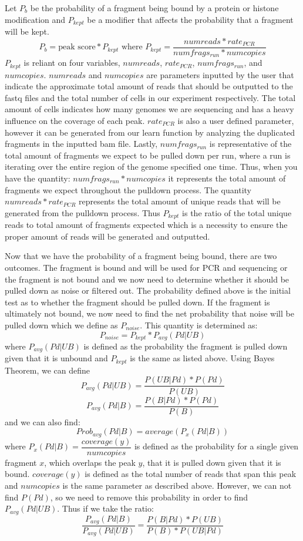  Let $P_b$ be the probability of a fragment being bound by a protein or histone modification and $P_{kept}$ be a modifier that affects the probability that a fragment will be kept. 
$$P_b = \text{peak score} * P_{kept} \text{ where } P_{kept} = \dfrac{numreads * rate_{PCR}}{numfrags_{run} * numcopies}$$
 $P_{kept}$ is reliant on four variables, $numreads$, $rate_{PCR}$, $numfrags_{run}$, and $numcopies$. $numreads$ and $numcopies$ are parameters inputted by the user that indicate the approximate total amount of reads that should be outputted to the fastq files and the total number of cells in our experiment respectively.
 The total amount of cells indicates how many genomes we are sequencing and has a heavy influence on the coverage of each peak.
 $rate_{PCR}$ is also a user defined parameter, however it can be generated from our learn function by analyzing the duplicated fragments in the inputted bam file. Lastly, $numfrags_{run}$ is representative of the total amount of fragments we expect to be pulled down per run, where a run is iterating over the entire region of the genome specified one time. Thus, when you have the quantity: $numfrags_{run}*numcopies$ it represents the total amount of fragments we expect throughout the pulldown process. The quantity $numreads*rate_{PCR}$ represents the total amount of unique reads that will be generated from the pulldown process. Thus $P_{kept}$ is the ratio of the total unique reads to total amount of fragments expected which is a necessity to ensure the proper amount of reads will be generated and outputted. 

Now that we have the probability of a fragment being bound, there are two outcomes. The fragment is bound and will be used for PCR and sequencing or the fragment is not bound and we now need to determine whether it should be pulled down as noise or filtered out. The probability defined above is the initial test as to whether the fragment should be pulled down. If the fragment is ultimately not bound, we now need to find the net probability that noise will be pulled down which we define as $P_{noise}$. This quantity is determined as:
$$P_{noise} = P_{kept}*P_{avg}(Pd|UB)$$
where $P_{avg}(Pd|UB)$ is defined as the probability the fragment is pulled down given that it is unbound and $P_{kept}$ is the same as listed above. Using Bayes Theorem, we can define
$$P_{avg}(Pd|UB) = \dfrac{P(UB|Pd)*P(Pd)}{P(UB)}$$
$$P_{avg}(Pd|B) = \dfrac{P(B|Pd)*P(Pd)}{P(B)}$$
and we can also find:
$$Prob_{avg}(Pd|B) = average(P_x(Pd|B))$$
where $P_x(Pd|B) = \dfrac{coverage(y)}{numcopies}$ is defined as the probability for a single given fragment $x$, which overlaps the peak $y$, that it is pulled down given that it is bound. $coverage(y)$ is defined as the total number of reads that span this peak and $numcopies$ is the same parameter as described above. However, we can not find $P(Pd)$, so we need to remove this probability in order to find $P_{avg}(Pd|UB)$.
Thus if we take the ratio:
$$\dfrac{P_{avg}(Pd|B)}{P_{avg}(Pd|UB)} = \dfrac{P(B|Pd)*P(UB)}{P(B)*P(UB|Pd)}$$

